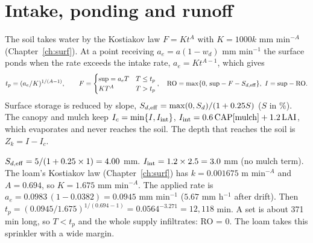 \section{Intake, ponding and runoff}\label{sec:pond}
The soil takes water by the Kostiakov law $F=Kt^A$ with $K=1000k$ mm min$^{-A}$ (Chapter~\ref{ch:surf}). At a point receiving $a_e=a(1-w_d)$ mm min$^{-1}$ the surface ponds when the rate exceeds the intake rate, $a_e=Kt^{A-1}$, which gives
\begin{equation}t_p=(a_e/K)^{1/(A-1)},\qquad F=\begin{cases}\mathrm{sup}=a_eT&T\le t_p\\KT^A&T>t_p\end{cases},\quad \mathrm{RO}=\max\{0,\,\mathrm{sup}-F-S_{d,\rm eff}\},\ I=\mathrm{sup}-\mathrm{RO}.\end{equation}
Surface storage is reduced by slope, $S_{d,\rm eff}=\max(0,S_d)/(1+0.25S)$ ($S$ in \%). The canopy and mulch keep $I_c=\min\{I,I_{\rm int}\}$, $I_{\rm int}=0.6\,\mathrm{CAP}[\text{mulch}]+1.2\,\mathrm{LAI}$, which evaporates and never reaches the soil. The depth that reaches the soil is $Z_k=I-I_c$.

\sol  $S_{d,\rm eff}=5/(1+0.25\times1)=4.00$ mm. $I_{\rm int}=1.2\times2.5=3.0$ mm (no mulch term). The loam's Kostiakov law (Chapter~\ref{ch:surf}) has $k=0.001675$ m min$^{-A}$ and $A=0.694$, so $K=1.675$ mm min$^{-A}$. The applied rate is $a_e=0.0983\,(1-0.0382)=0.0945$ mm min$^{-1}$ ($5.67$ mm h$^{-1}$ after drift). Then $t_p=(0.0945/1.675)^{1/(0.694-1)}=0.0564^{-3.271}=12{,}118$ min. A set is about 371 min long, so $T<t_p$ and the whole supply infiltrates: RO = 0. The loam takes this sprinkler with a wide margin.


